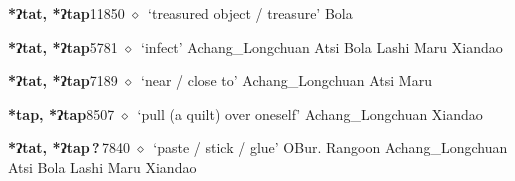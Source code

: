 \begin{list}{}{\leftmargin=1.5em \itemindent=-1.5em}
  \item {\footnotesize \textbf{*ʔtat, *ʔtap}}{\tiny 11850}
\hspace{1ex}
         $\diamond$~`treasured object / treasure'
         Bola 
  \item {\footnotesize \textbf{*ʔtat, *ʔtap}}{\tiny 5781}
\hspace{1ex}
         $\diamond$~`infect'
         Achang\_Longchuan 
\hspace{1ex}
         Atsi 
\hspace{1ex}
         Bola 
\hspace{1ex}
         Lashi 
\hspace{1ex}
         Maru 
\hspace{1ex}
         Xiandao 
  \item {\footnotesize \textbf{*ʔtat, *ʔtap}}{\tiny 7189}
\hspace{1ex}
         $\diamond$~`near / close to'
         Achang\_Longchuan 
\hspace{1ex}
         Atsi 
\hspace{1ex}
         Maru 
  \item {\footnotesize \textbf{*tap, *ʔtap}}{\tiny 8507}
\hspace{1ex}
         $\diamond$~`pull (a quilt) over oneself'
         Achang\_Longchuan 
\hspace{1ex}
         Xiandao 
  \item {\footnotesize \textbf{*ʔtat, *ʔtap\,?\,}}{\tiny 7840}
\hspace{1ex}
         $\diamond$~`paste / stick / glue'
         OBur. 
\hspace{1ex}
         Rangoon 
\hspace{1ex}
         Achang\_Longchuan 
\hspace{1ex}
         Atsi 
\hspace{1ex}
         Bola 
\hspace{1ex}
         Lashi 
\hspace{1ex}
         Maru 
\hspace{1ex}
         Xiandao 
  \end{list}
